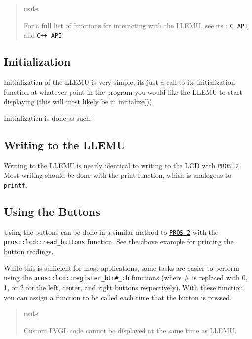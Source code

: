 \begin{quote}
{\bfseries note}

For a full list of functions for interacting with the L\+L\+E\+MU, see its \+: \href{../../api/c/llemu.html}{\tt C A\+PI} and \href{../../api/cpp/llemu.html}{\tt C++ A\+PI}. \end{quote}


\subsection*{Initialization}

Initialization of the L\+L\+E\+MU is very simple, it\textquotesingle{}s just a call to its initialization function at whatever point in the program you would like the L\+L\+E\+MU to start displaying (this will most likely be in {\ttfamily \hyperlink{main_8h_a9efe22aaead3a5e936b5df459de02eba}{initialize()}}).

Initialization is done as such\+:

\subsection*{Writing to the L\+L\+E\+MU}

Writing to the L\+L\+E\+MU is nearly identical to writing to the L\+CD with \href{../../cortex/tutorials/lcd.html}{\tt P\+R\+OS 2}. Most writing should be done with the print function, which is analogous to \href{http://www.cplusplus.com/reference/cstdio/printf/}{\tt printf}.

\subsection*{Using the Buttons}

Using the buttons can be done in a similar method to \href{../../../cortex/tutorials/lcd.html}{\tt P\+R\+OS 2} with the \href{../../api/cpp/llemu.html#read-buttons}{\tt pros\+::lcd\+::read\+\_\+buttons} function. See the above example for printing the button readings.

While this is sufficient for most applications, some tasks are easier to perform using the \href{../../api/cpp/llemu.html#register-btn0-cb}{\tt pros\+::lcd\+::register\+\_\+btn\#\+\_\+cb} functions (where \# is replaced with 0, 1, or 2 for the left, center, and right buttons respectively). With these function you can assign a function to be called each time that the button is pressed.

\begin{quote}
{\bfseries note}

Custom L\+V\+GL code cannot be displayed at the same time as L\+L\+E\+MU.\end{quote}

